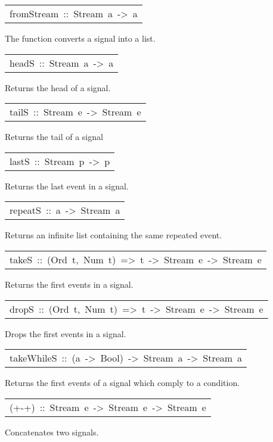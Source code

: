 \begin{haddockdesc}
\item[\begin{tabular}{@{}l}
fromStream\ ::\ Stream\ a\ ->\ {\char 91}a{\char 93}
\end{tabular}]\haddockbegindoc
The function  converts a signal into a list.\par


\item[\begin{tabular}{@{}l}
headS\ ::\ Stream\ a\ ->\ a
\end{tabular}]\haddockbegindoc
Returns the head of a signal.\par


\item[\begin{tabular}{@{}l}
tailS\ ::\ Stream\ e\ ->\ Stream\ e
\end{tabular}]\haddockbegindoc
Returns the tail of a signal\par


\item[\begin{tabular}{@{}l}
lastS\ ::\ Stream\ p\ ->\ p
\end{tabular}]\haddockbegindoc
Returns the last event in a signal.\par


\item[\begin{tabular}{@{}l}
repeatS\ ::\ a\ ->\ Stream\ a
\end{tabular}]\haddockbegindoc
Returns an infinite list containing the same repeated event.\par


\item[\begin{tabular}{@{}l}
takeS\ ::\ (Ord\ t,\ Num\ t)\ =>\ t\ ->\ Stream\ e\ ->\ Stream\ e
\end{tabular}]\haddockbegindoc
Returns the first  events in a signal.\par


\item[\begin{tabular}{@{}l}
dropS\ ::\ (Ord\ t,\ Num\ t)\ =>\ t\ ->\ Stream\ e\ ->\ Stream\ e
\end{tabular}]\haddockbegindoc
Drops the first  events in a signal.\par


\item[\begin{tabular}{@{}l}
takeWhileS\ ::\ (a\ ->\ Bool)\ ->\ Stream\ a\ ->\ Stream\ a
\end{tabular}]\haddockbegindoc
Returns the first events of a signal which comply to a condition.\par


\item[\begin{tabular}{@{}l}
(+-+)\ ::\ Stream\ e\ ->\ Stream\ e\ ->\ Stream\ e
\end{tabular}]\haddockbegindoc
Concatenates two signals.\par

\end{haddockdesc}